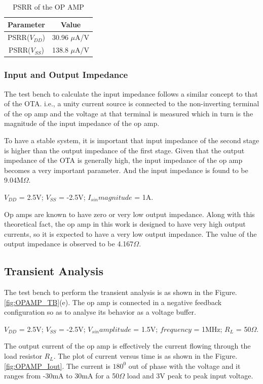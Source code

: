 \begin{table} [H]
\centering
\begin{tabular}{@{}cc@{}}
\toprule
Parameter					& Value				\\ \midrule
PSRR($V_{DD}$)				& 30.96 $\mu$A/V		\\
PSRR($V_{SS}$)				& 138.8 $\mu$A/V		\\
\bottomrule
\end{tabular}
\caption{PSRR of the OP AMP}
\label{tab:OPAMP_PSRR}
\end{table}

\subsubsection{Input and Output Impedance}
The test bench to calculate the input impedance follows a similar concept to that of the OTA. i.e., a unity current source is connected to the non-inverting terminal of the op amp and the voltage at that terminal is measured which in turn is the magnitude of the input impedance of the op amp.

To have a stable system, it is important that input impedance of the second stage is higher than the output impedance of the first stage. Given that the output impedance of the OTA is generally high, the input impedance of the op amp becomes a very important parameter. And the input impedance is found to be 9.04M$\Omega$.

$V_{DD}$ = 2.5V; $V_{SS}$ = -2.5V; $I_{sin} magnitude $ = 1A.

Op amps are known to have zero or very low output impedance. Along with this theoretical fact, the op amp in this work is designed to have very high output currents, so it is expected to have a very low output impedance. The value of the output impedance is observed to be 4.167$\Omega$.

\subsection{Transient Analysis}
The test bench to perform the transient analysis is as shown in the Figure.\ref{fig:OPAMP_TB}(e). The op amp is connected in a negative feedback configuration so as to analyse its behavior as a voltage buffer.

$V_{DD}$ = 2.5V; $V_{SS}$ = -2.5V; $V_{sin} amplitude $ = 1.5V; $frequency$ = 1MHz; $R_L$ = 50$\Omega$.

The output current of the op amp is effectively the current flowing through the load resistor $R_L$. The plot of current versus time is as shown in the Figure.\ref{fig:OPAMP_Iout}. The current is $180^0$ out of phase with the voltage and it ranges from -30mA to 30mA for a 50$\Omega$ load and 3V peak to peak input voltage. 

